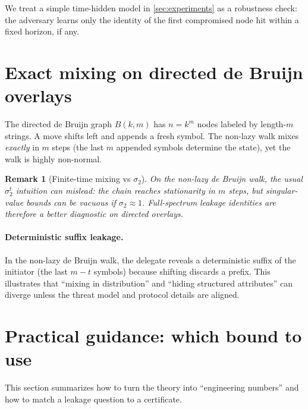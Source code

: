\documentclass[11pt]{article}
\newtheorem{remark}[theorem]{Remark}
\begin{document}
We treat a simple time-hidden model in \cref{sec:experiments} as a robustness
check: the adversary learns only the identity of the first compromised node hit
within a fixed horizon, if any.

\section{Exact mixing on directed de Bruijn overlays}\label{sec:debruijn}
The directed de Bruijn graph $B(k,m)$ has $n=k^m$ nodes labeled by length-$m$
strings. A move shifts left and appends a fresh symbol. The non-lazy walk mixes
\emph{exactly} in $m$ steps (the last $m$ appended symbols determine the state),
yet the walk is highly non-normal.

\begin{remark}[Finite-time mixing vs $\sigma_2$]
On the non-lazy de Bruijn walk, the usual $\sigma_2^t$ intuition can mislead:
the chain reaches stationarity in $m$ steps, but singular-value bounds can be
vacuous if $\sigma_2\approx 1$. Full-spectrum leakage identities are therefore
a better diagnostic on directed overlays.
\end{remark}

\paragraph{Deterministic suffix leakage.}
In the non-lazy de Bruijn walk, the delegate reveals a deterministic suffix of
the initiator (the last $m-t$ symbols) because shifting discards a prefix. This
illustrates that ``mixing in distribution'' and ``hiding structured attributes''
can diverge unless the threat model and protocol details are aligned.


\section{Practical guidance: which bound to use}\label{sec:guidance}
This section summarizes how to turn the theory into ``engineering numbers'' and
how to match a leakage question to a certificate.
\end{document}
